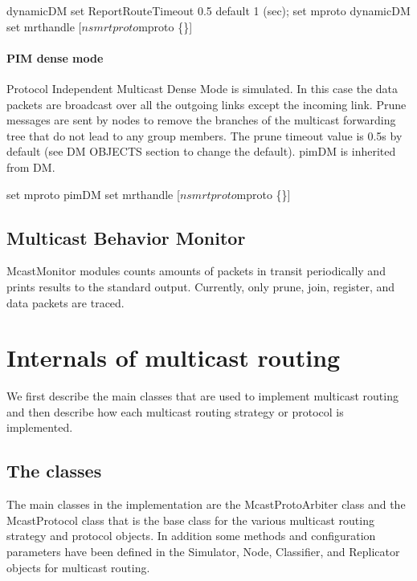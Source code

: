 \begin{program}
	dynamicDM set ReportRouteTimeout 0.5  \; default 1 (sec);
	set mproto dynamicDM
	set mrthandle [$ns mrtproto $mproto \{\}]
\end{program}

\paragraph{PIM dense mode}
Protocol Independent Multicast Dense Mode is simulated. 
In this case the data packets are broadcast over all the outgoing 
links except the incoming link. Prune messages are sent by nodes to 
remove the branches of the multicast forwarding tree that do not 
lead to any group members. The prune timeout value is 0.5s by
default (see DM OBJECTS section to change the default). pimDM is inherited from DM.

\begin{program}
	set mproto pimDM
	set mrthandle [$ns mrtproto $mproto \{\}]
\end{program}

\subsection{Multicast Behavior Monitor}
McastMonitor modules counts amounts of packets in transit periodically and prints results to the standard output.  Currently, only prune, join, register, and data packets are traced.  


\section{Internals of multicast routing}
\label{sec:mcast-internals}

We first describe the main classes that are used to implement multicast routing and then describe how each multicast routing strategy
or protocol is implemented.

\subsection{The classes}
The main classes in the implementation are
the McastProtoArbiter class and the McastProtocol class that is the base class for the various multicast routing strategy and protocol objects.
In addition some methods and configuration parameters have been defined in the Simulator, Node, Classifier, and Replicator objects for multicast routing.

